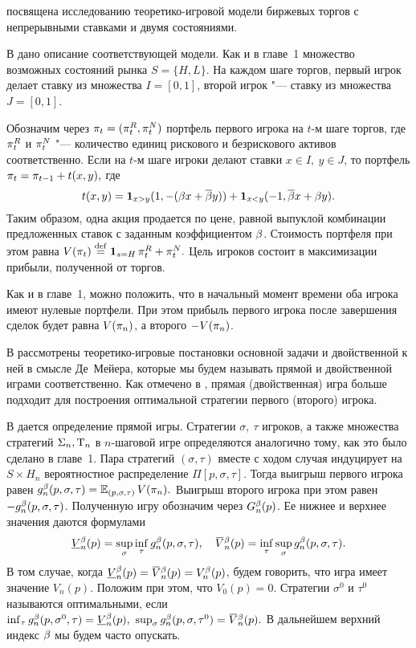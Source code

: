  посвящена исследованию теоретико-игровой модели биржевых торгов с непрерывными ставками и двумя состояниями. 

В  дано описание соответствующей модели.
Как и в главе~1 множество возможных состояний рынка $S = \{H, L\}$.
На каждом шаге торгов, первый игрок делает ставку из множества $I = [0, 1]$, второй игрок "--- ставку из множества $J = [0, 1]$.

Обозначим через $\pi_{t} = (\pi_{t}^R, \pi_{t}^N)$ портфель первого игрока на $t$-м шаге торгов, где $\pi_{t}^R$ и $\pi_{t}^N$ "--- количество единиц рискового и безрискового активов соответственно.
Если на $t$-м шаге игроки делают ставки $x \in I,\ y \in J$, то портфель 
$
\pi_{t} = \pi_{t-1} + t(x, y),
$
где
\begin{equation}\label{ch3:eq:trans-mech}
  t(x, y) = \mathbf{1}_{x > y} (1, -(\beta x + {{\overline{\beta}}} y)) +
  \mathbf{1}_{x < y} (-1, {{\overline{\beta}}} x + \beta y).
\end{equation}
Таким образом, одна акция продается по цене, равной выпуклой комбинации предложенных ставок с заданным коэффициентом $\beta$.
Стоимость портфеля при этом равна
$
  V(\pi_{t}) \overset{\mathrm{def}}{=} \mathbf{1}_{s = H} \, \pi_{t}^R + \pi_{t}^N.
$
Цель игроков состоит в максимизации прибыли, полученной от торгов.

Как и в главе~1, можно положить, что в начальный момент времени оба игрока имеют нулевые портфели.
При этом прибыль первого игрока после завершения сделок будет равна $V(\pi_{n})$, а второго $-V(\pi_{n})$.

В  рассмотрены теоретико-игровые постановки основной задачи и двойственной к ней в смысле Де~Мейера, которые мы будем называть прямой и двойственной играми соответственно.
Как отмечено в \cite{demeyer02}, прямая (двойственная) игра больше подходит для построения оптимальной стратегии первого (второго) игрока.

В  дается определение прямой игры.
Стратегии $\sigma,\ \tau$ игроков, а также множества стратегий $\Sigma_n, \mathrm{T}_n$ в $n$-шаговой игре определяются аналогично тому, как это было сделано в главе~1.
Пара стратегий $(\sigma, \tau)$ вместе с ходом случая индуцирует на $S \times H_n$ вероятностное распределение $\Pi[p, \sigma, \tau]$.
Тогда выигрыш первого игрока равен
$
  g^{\beta}_n(p, \sigma, \tau) = \operatorname{\mathbb{E}}_{( p, \sigma, \tau )} V(\pi_{n}).
$
Выигрыш второго игрока при этом равен $-g^{\beta}_n(p, \sigma, \tau)$.
Полученную игру обозначим через $G^{\beta}_n(p)$. 
Ее нижнее и верхнее значения даются формулами
\begin{align*}
  \LV[\Co]{n}(p) = \sup_\sigma \inf_\tau g^\Co_n(p, \sigma, \tau), \quad
  \HV[\Co]{n}(p) = \inf_\tau \sup_\sigma g^\Co_n(p, \sigma, \tau).
\end{align*}
В том случае, когда $\LV[\Co]{n}(p) = \HV[\Co]{n}(p) = V^\Co_n(p)$, будем говорить, что игра имеет значение $V_n(p)$.
Положим при этом, что $V_0(p) = 0$.
Стратегии $\sigma^0$ и $\tau^0$ называются оптимальными, если
$
  \inf_\tau g^\Co_n(p, \sigma^0, \tau) = \LV[\Co]{n}(p),\
  \sup_\sigma g^\Co_n(p, \sigma, \tau^0) = \HV[\Co]{n}(p).
$
В дальнейшем верхний индекс $\beta$ мы будем часто опускать.


